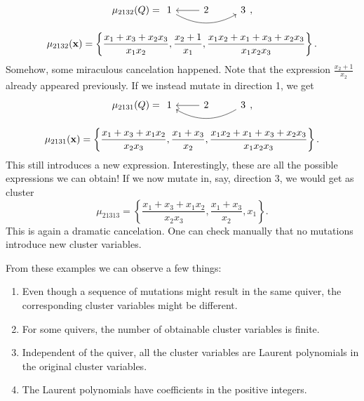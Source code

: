 \begin{example}
	\begin{equation*}
		\mu_{2132}(Q) =
		\begin{tikzcd}
			1 \rar[leftarrow] \ar[rr, bend right] & 2 & 3
		\end{tikzcd},
	\end{equation*}
	\begin{equation*}
		\mu_{2132}(\mathbf{x})= \left\{\frac{x_1 + x_3 + x_2x_3}{x_1x_2}, \frac{x_2 + 1}{x_1}, \frac{x_1 x_2 + x_1 + x_3 + x_2 x_3}{x_1x_2x_3}\right\}.
	\end{equation*}
	Somehow, some miraculous cancelation happened.
	Note that the expression $\frac{x_2 + 1}{x_2}$ already appeared previously.
	If we instead mutate in direction 1, we get
	\begin{equation*}
		\mu_{2131}(Q) =
		\begin{tikzcd}
			1 \rar[leftarrow] \ar[rr,leftarrow, bend right] & 2 & 3
		\end{tikzcd},
	\end{equation*}
	\begin{equation*}
		\mu_{2131}(\mathbf{x}) = \left\{\frac{x_1 + x_3 + x_1x_2}{x_2x_3}, \frac{x_1 + x_3}{x_2}, \frac{x_1 x_2 + x_1 + x_3 + x_2 x_3}{x_1x_2x_3}\right\}.
	\end{equation*}
	This still introduces a new expression.
	Interestingly, these are all the possible expressions we can obtain!
	If we now mutate in, say, direction 3, we would get as cluster
	\begin{equation*}
		\mu_{21313} = \left\{\frac{x_1 + x_3 + x_1x_2}{x_2x_3}, \frac{x_1 + x_3}{x_2}, x_1 \right\}.
	\end{equation*}
	This is again a dramatic cancelation. One can check manually
	that no mutations introduce new cluster variables.
\end{example}

From these examples we can observe a few things:
\begin{enumerate}
	\item Even though a sequence of mutations might result in the same quiver, the corresponding
	      cluster variables might be different.
	\item For some quivers, the number of obtainable cluster variables is finite.
	\item Independent of the quiver, all the cluster variables are Laurent polynomials in the
	      original cluster variables.
	\item The Laurent polynomials have coefficients in the positive integers.
\end{enumerate}

